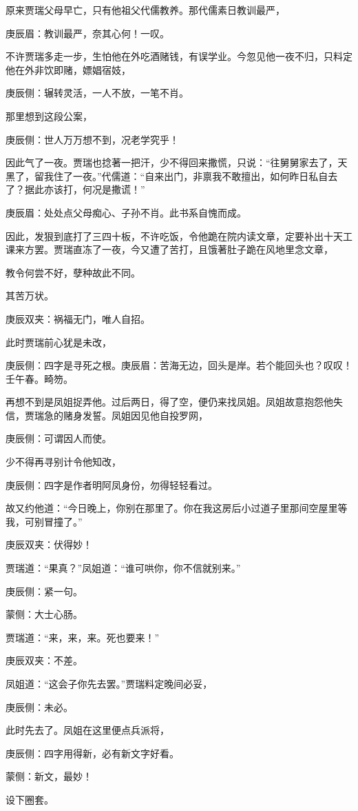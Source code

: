 \begin{parag}
    原来贾瑞父母早亡，只有他祖父代儒教养。那代儒素日教训最严，\begin{note}庚辰眉：教训最严，奈其心何！一叹。\end{note}不许贾瑞多走一步，生怕他在外吃酒赌钱，有误学业。今忽见他一夜不归，只料定他在外非饮即赌，嫖娼宿妓，\begin{note}庚辰侧：辗转灵活，一人不放，一笔不肖。\end{note}那里想到这段公案，\begin{note}庚辰侧：世人万万想不到，况老学究乎！\end{note}因此气了一夜。贾瑞也捻著一把汗，少不得回来撒慌，只说：“往舅舅家去了，天黑了，留我住了一夜。”代儒道：“自来出门，非禀我不敢擅出，如何昨日私自去了？据此亦该打，何况是撒谎！”\begin{note}庚辰眉：处处点父母痴心、子孙不肖。此书系自愧而成。\end{note}因此，发狠到底打了三四十板，不许吃饭，令他跪在院内读文章，定要补出十天工课来方罢。贾瑞直冻了一夜，今又遭了苦打，且饿著肚子跪在风地里念文章，\begin{note}教令何尝不好，孽种故此不同。\end{note}其苦万状。\begin{note}庚辰双夹：祸福无门，唯人自招。\end{note}
\end{parag}


\begin{parag}
    此时贾瑞前心犹是未改，\begin{note}庚辰侧：四字是寻死之根。庚辰眉：苦海无边，回头是岸。若个能回头也？叹叹！壬午春。畸笏。\end{note}再想不到是凤姐捉弄他。过后两日，得了空，便仍来找凤姐。凤姐故意抱怨他失信，贾瑞急的赌身发誓。凤姐因见他自投罗网，\begin{note}庚辰侧：可谓因人而使。\end{note}少不得再寻别计令他知改，\begin{note}庚辰侧：四字是作者明阿凤身份，勿得轻轻看过。\end{note}故又约他道：“今日晚上，你别在那里了。你在我这房后小过道子里那间空屋里等我，可别冒撞了。”\begin{note}庚辰双夹：伏得妙！\end{note}贾瑞道：“果真？”凤姐道：“谁可哄你，你不信就别来。”\begin{note}庚辰侧：紧一句。\end{note}\begin{note}蒙侧：大士心肠。\end{note}贾瑞道：“来，来，来。死也要来！”\begin{note}庚辰双夹：不差。\end{note}凤姐道：“这会子你先去罢。”贾瑞料定晚间必妥，\begin{note}庚辰侧：未必。\end{note}此时先去了。凤姐在这里便点兵派将，\begin{note}庚辰侧：四字用得新，必有新文字好看。\end{note}\begin{note}蒙侧：新文，最妙！\end{note}设下圈套。
\end{parag}


